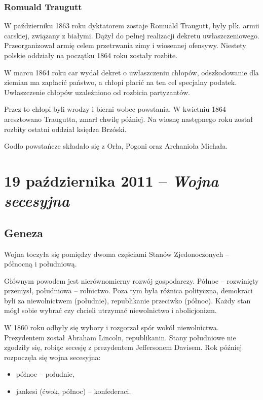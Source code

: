 \documentclass [a4paper, 11pt, oneside]{book}
\begin{document}
        \subsection{Romuald Traugutt} %
        \label{sec:romuald_traugutt}
            W październiku 1863 roku dyktatorem zostaje Romuald Traugutt, były płk. armii carskiej, związany z białymi. Dążył do pełnej realizacji dekretu uwłaszczeniowego. Przeorganizował armię celem przetrwania zimy i wiosennej ofensywy. Niestety polskie oddziały na początku 1864 roku zostały rozbite.

            W marcu 1864 roku car wydał dekret o uwłaszczeniu chłopów, odszkodowanie dla ziemian ma zapłacić państwo, a chłopi płacić na ten cel specjalny podatek. Uwłaszczenie chłopów uzależniono od rozbicia partyzantów.

            Przez to chłopi byli wrodzy i bierni wobec powstania. W kwietniu 1864 aresztowano Traugutta, zmarł chwilę później. Na wiosnę następnego roku został rozbity ostatni oddział księdza Brzóski.

            Godło powstańcze składało się z Orła, Pogoni oraz Archanioła Michała.
\chapter{19 października 2011 -- \textit{Wojna secesyjna}} %
\label{cha:19_pa_dziernika_2011_textit}
    \section{Geneza} %
    \label{sec:geneza}
        Wojna toczyła się pomiędzy dwoma częściami Stanów Zjedonoczonych -- północną i południową.

        Głównym powodem jest nierównomierny rozwój gospodarczy. Północ -- rozwinięty przemysł, południowa -- rolnictwo. Poza tym była różnica polityczna, demokraci byli za niewolnictwem (południe), republikanie przeciwko (północ). Każdy stan mógł sobie wybrać czy chcieli utrzymać niewolnictwo i abolicjonizm.

        W 1860 roku odbyły się wybory i rozgorzał spór wokół niewolnictwa. Prezydentem został Abraham Lincoln, republikanin. Stany południowe nie zgodziły się, robiąc secesję z prezydentem Jeffersonem Davisem. Rok później rozpoczęła się wojna secesyjna:
        \begin{itemize}
            \item północ -- południe,
            \item jankesi (ćwok, północ) -- konfederaci.
        \end{itemize}
\end{document}
